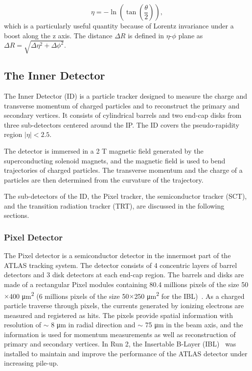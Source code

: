 \begin{equation}
    \label{eq:eta}
    \eta = -\ln (\tan (\frac{\theta}{2})),
\end{equation}
%
which is a particularly useful quantity because of Lorentz invariance under a boost along the z axis. The distance $\Delta R$ is defined in $\eta$-$\phi$ plane as $\Delta R = \sqrt{\Delta \eta^{2} + \Delta \phi^{2}}$.

\subsection{The Inner Detector}
\label{sec:atlas:id}
The Inner Detector (ID) is a particle tracker designed to measure the charge and transverse momentum of charged particles and to reconstruct the primary and secondary vertices. It consists of cylindrical barrels and two end-cap disks from three sub-detectors centered around the IP. The ID covers the pseudo-rapidity region $|\eta| < 2.5$. 

The detector is immersed  in a 2 T magnetic field generated by the superconducting solenoid magnets, and the magnetic field is used to bend trajectories of charged particles. The transverse momentum and the charge of a particles are then determined from the curvature of the trajectory.

The sub-detectors of the ID, the Pixel tracker, the semiconductor tracker (SCT), and the transition radiation tracker (TRT), are discussed in the following sections.

\subsubsection{Pixel Detector}
\label{sec:atlas:pixel}

The Pixel detector is a semiconductor detector in the innermost part of the ATLAS tracking system. The detector consists of 4 concentric layers of barrel detectors and 3 disk detectors at each end-cap region. The barrels and disks are made of a rectangular Pixel modules containing 80.4 millions pixels of the size 50$\times$400 \si{\micro\meter^{2}} (6 millions pixels of the size 50$\times$250 \si{\micro\meter^{2}} for the IBL)~\cite{1748-0221-10-06-C06012}. As a charged particle traverse through pixels, the currents generated by ionizing electrons are measured and registered as hits. The pixels provide spatial information with resolution of $\sim$ 8 \si{\micro\meter} in radial direction and $\sim$ 75 \si{\micro\meter} in the beam axis, and the information is used for momentum measurements as well as reconstruction of primary and secondary vertices. In Run 2, the Insertable B-Layer (IBL)~\cite{Abbott:2307576} was installed to maintain and improve the performance of the ATLAS detector under increasing pile-up.

